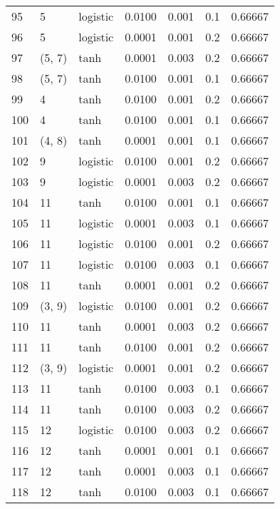 \begin{tabular}{lllrrrr}
95  &           5 &  logistic &  0.0100 &  0.001 &  0.1 &   0.66667 \\
96  &           5 &  logistic &  0.0001 &  0.001 &  0.2 &   0.66667 \\
97  &      (5, 7) &      tanh &  0.0001 &  0.003 &  0.2 &   0.66667 \\
98  &      (5, 7) &      tanh &  0.0100 &  0.001 &  0.1 &   0.66667 \\
99  &           4 &      tanh &  0.0100 &  0.001 &  0.2 &   0.66667 \\
100 &           4 &      tanh &  0.0100 &  0.001 &  0.1 &   0.66667 \\
101 &      (4, 8) &      tanh &  0.0001 &  0.001 &  0.1 &   0.66667 \\
102 &           9 &  logistic &  0.0100 &  0.001 &  0.2 &   0.66667 \\
103 &           9 &  logistic &  0.0001 &  0.003 &  0.2 &   0.66667 \\
104 &          11 &      tanh &  0.0100 &  0.001 &  0.1 &   0.66667 \\
105 &          11 &  logistic &  0.0001 &  0.003 &  0.1 &   0.66667 \\
106 &          11 &  logistic &  0.0100 &  0.001 &  0.2 &   0.66667 \\
107 &          11 &  logistic &  0.0100 &  0.003 &  0.1 &   0.66667 \\
108 &          11 &      tanh &  0.0001 &  0.001 &  0.2 &   0.66667 \\
109 &      (3, 9) &  logistic &  0.0100 &  0.001 &  0.2 &   0.66667 \\
110 &          11 &      tanh &  0.0001 &  0.003 &  0.2 &   0.66667 \\
111 &          11 &      tanh &  0.0100 &  0.001 &  0.2 &   0.66667 \\
112 &      (3, 9) &  logistic &  0.0001 &  0.001 &  0.2 &   0.66667 \\
113 &          11 &      tanh &  0.0100 &  0.003 &  0.1 &   0.66667 \\
114 &          11 &      tanh &  0.0100 &  0.003 &  0.2 &   0.66667 \\
115 &          12 &  logistic &  0.0100 &  0.003 &  0.2 &   0.66667 \\
116 &          12 &      tanh &  0.0001 &  0.001 &  0.1 &   0.66667 \\
117 &          12 &      tanh &  0.0001 &  0.003 &  0.1 &   0.66667 \\
118 &          12 &      tanh &  0.0100 &  0.003 &  0.1 &   0.66667 \\

\end{tabular}
